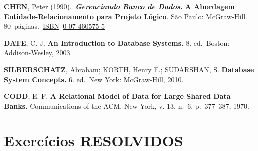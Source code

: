 \documentclass[
]{book}
\begin{document}
\textbf{CHEN}, Peter (1990).~\textbf{\emph{Gerenciando Banco de Dados}. A Abordagem Entidade-Relacionamento para Projeto Lógico}. São Paulo: McGraw-Hill. 80~páginas.~\href{https://pt.wikipedia.org/wiki/International_Standard_Book_Number}{ISBN}~\href{https://pt.wikipedia.org/wiki/Especial:Fontes_de_livros/0-07-460575-5}{0-07-460575-5}

\textbf{DATE}, C. J. \textbf{An Introduction to Database Systems.} 8. ed.~Boston: Addison-Wesley, 2003.

\textbf{SILBERSCHATZ}, Abraham; KORTH, Henry F.; SUDARSHAN, S. \textbf{Database System Concepts.} 6. ed.~New York: McGraw-Hill, 2010.

\textbf{CODD}, E. F. \textbf{A Relational Model of Data for Large Shared Data Banks.} Communications of the ACM, New York, v. 13, n.~6, p.~377--387, 1970.

\section{Exercícios RESOLVIDOS}\label{exercuxedcios-resolvidos}
\end{document}
